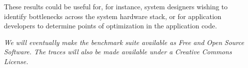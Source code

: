 \documentclass[portrait, a1]{KTHEEposter}
\begin{document}
\begin{pcolumns}[3]
\begin{pcolumn}[3]
\begin{pframe}[1.95]
                 These results could be useful for, for instance, system designers wishing to identify bottlenecks across the system hardware stack, or for application developers to determine points of optimization in the application code.
            \end{pframe}
            \begin{pframe}[.24]
                \itshape
                We will eventually make the benchmark suite available as Free and Open Source Software.
                The traces will also be made available under a Creative Commons License.
            \end{pframe}    
            \begin{pframe**}[.81]
                \nocite{*}
                \small
                \printbibliography
            \end{pframe**}
        \end{pcolumn}
    \end{pcolumns}
    
\end{document}
